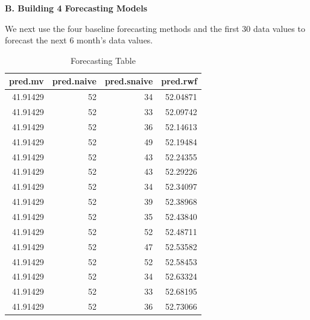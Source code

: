 \documentclass[
]{book}
\newenvironment{Shaded}{\begin{snugshade}}{\end{snugshade}}
\newcommand{\AttributeTok}[1]{\textcolor[rgb]{0.13,0.29,0.53}{#1}}
\newcommand{\ConstantTok}[1]{\textcolor[rgb]{0.56,0.35,0.01}{#1}}
\newcommand{\DecValTok}[1]{\textcolor[rgb]{0.00,0.00,0.81}{#1}}
\newcommand{\DocumentationTok}[1]{\textcolor[rgb]{0.56,0.35,0.01}{\textbf{\textit{#1}}}}
\newcommand{\FunctionTok}[1]{\textcolor[rgb]{0.13,0.29,0.53}{\textbf{#1}}}
\newcommand{\NormalTok}[1]{#1}
\newcommand{\OtherTok}[1]{\textcolor[rgb]{0.56,0.35,0.01}{#1}}
\newcommand{\SpecialCharTok}[1]{\textcolor[rgb]{0.81,0.36,0.00}{\textbf{#1}}}
\newcommand{\StringTok}[1]{\textcolor[rgb]{0.31,0.60,0.02}{#1}}
\begin{document}
\textbf{B. Building 4 Forecasting Models}

We next use the four baseline forecasting methods and the first 30 data values to forecast the next 6 month's data values.

\begin{Shaded}
\end{Shaded}

\begin{table}

\caption{\label{tab:unnamed-chunk-206}Forecasting Table}
\centering
\begin{tabular}[t]{r|r|r|r}
\hline
pred.mv & pred.naive & pred.snaive & pred.rwf\\
\hline
41.91429 & 52 & 34 & 52.04871\\
\hline
41.91429 & 52 & 33 & 52.09742\\
\hline
41.91429 & 52 & 36 & 52.14613\\
\hline
41.91429 & 52 & 49 & 52.19484\\
\hline
41.91429 & 52 & 43 & 52.24355\\
\hline
41.91429 & 52 & 43 & 52.29226\\
\hline
41.91429 & 52 & 34 & 52.34097\\
\hline
41.91429 & 52 & 39 & 52.38968\\
\hline
41.91429 & 52 & 35 & 52.43840\\
\hline
41.91429 & 52 & 52 & 52.48711\\
\hline
41.91429 & 52 & 47 & 52.53582\\
\hline
41.91429 & 52 & 52 & 52.58453\\
\hline
41.91429 & 52 & 34 & 52.63324\\
\hline
41.91429 & 52 & 33 & 52.68195\\
\hline
41.91429 & 52 & 36 & 52.73066\\
\hline
\end{tabular}
\end{table}
\end{document}
